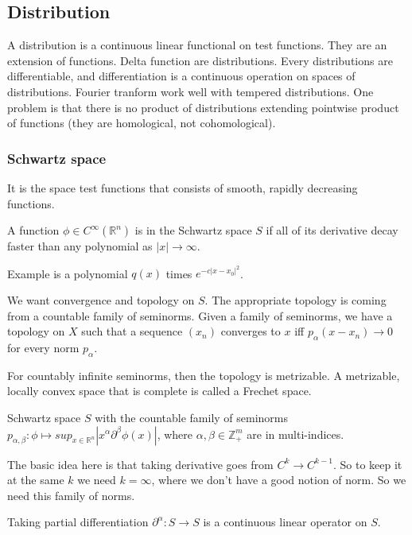 \documentclass[main.tex]{subfiles}
\begin{document}
\subsection{Distribution}
A distribution is a continuous linear functional on test functions. They are an extension of functions. Delta function are distributions. Every distributions are differentiable, and differentiation is a continuous operation on spaces of distributions. Fourier tranform work well with tempered distributions. One problem is that there is no product of distributions extending pointwise product of functions (they are homological, not cohomological). 

\subsubsection{Schwartz space}
It is the space test functions that consists of smooth, rapidly decreasing functions.

\begin{definition}
A function $\phi \in C^\infty(\mathbb{R}^n)$ is in the Schwartz space $S$ if all of its derivative decay faster than any polynomial as $|x| \rightarrow \infty$.
\end{definition}

Example is a polynomial $q(x)$ times $e^{-c |x - x_0|^2}$. 

We want convergence and topology on $S$. The appropriate topology is coming from a countable family of seminorms. Given a family of seminorms, we have a topology on $X$ such that a sequence $(x_n)$ converges to $x$ iff $p_\alpha(x - x_n) \rightarrow 0$ for every norm $p_\alpha$.

For countably infinite seminorms, then the topology is metrizable. A metrizable, locally convex space that is complete is called a Frechet space.

Schwartz space $S$ with the countable family of seminorms $p_{\alpha, \beta}: \phi \mapsto sup_{x \in \mathbb{R}^n} |x^\alpha \partial^\beta \phi(x)|$, where $\alpha, \beta \in \mathbb{Z}^m _+$ are in multi-indices.

\begin{remark}
The basic idea here is that taking derivative goes from $C^k \rightarrow C^{k-1}$. So to keep it at the same $k$ we need $k = \infty$, where we don't have a good notion of norm. So we need this family of norms.
\end{remark}

\begin{proposition}
Taking partial differentiation $\partial^\alpha: S \rightarrow S$ is a continuous linear operator on $S$.
\end{proposition}
\end{document}
